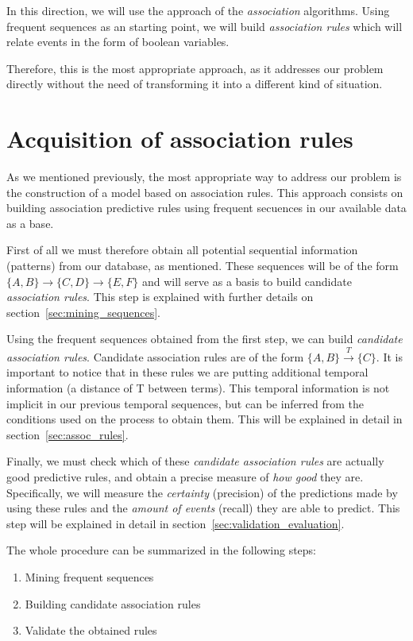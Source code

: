 \documentclass[a4paper,12pt]{article}
\begin{document}
In this direction, we will use the approach of the \emph{association} algorithms. Using frequent sequences as an starting point, we will build \emph{association rules} which will relate events in the form of boolean variables.

Therefore, this is the most appropriate approach, as it addresses our problem directly without the need of transforming it into a different kind of situation.

\section{Acquisition of association rules}
\label{sec:rule_model}
As we mentioned previously, the most appropriate way to address our problem is the construction of a model based on association rules. This approach consists on building association predictive rules using frequent secuences in our available data as a base.

First of all we must therefore obtain all potential sequential information (patterns) from our database, as mentioned. These sequences will be of the form $\{A, B\} \longrightarrow \{C, D\} \longrightarrow \{E, F\}$ and will serve as a basis to build candidate \emph{association rules}. This step is explained with further details on section~\ref{sec:mining_sequences}.

Using the frequent sequences obtained from the first step, we can build \emph{candidate association rules}. Candidate association rules are of the form $\{A, B\} \xrightarrow{T} \{C\}$. It is important to notice that in these rules we are putting additional temporal information (a distance of T between terms). This temporal information is not implicit in our previous temporal sequences, but can be inferred from the conditions used on the process to obtain them. This will be explained in detail in section~\ref{sec:assoc_rules}.

Finally, we must check which of these \emph{candidate association rules} are actually good predictive rules, and obtain a precise measure of \emph{how good} they are. Specifically, we will measure the \emph{certainty} (precision) of the predictions made by using these rules and the \emph{amount of events} (recall) they are able to predict. This step will be explained in detail in section~\ref{sec:validation_evaluation}.

The whole procedure can be summarized in the following steps:
\begin{enumerate}
\item Mining frequent sequences
\item Building candidate association rules
\item Validate the obtained rules
\end{enumerate}
\end{document}
